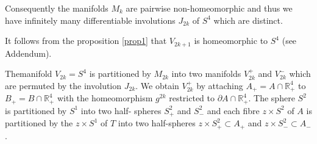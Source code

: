 Consequently the manifolds $M_k$ are pairwise non-homeomorphic  and
thus we have infinitely many differentiable involutions $J_{2k}$ of
$S^4$ which are distinct. 

It follows from the proposition \ref{prop1} that $V_{2k +1}$ is homeomorphic
to $S^4$ (see Addendum). 

The\pageoriginale manifold $V_{2k} = S^4$  is partitioned by $M_{2k}$
into two 
manifolds $V^+ _{2k}$ and $V^-_{2k}$ which are permuted by the
involution $J_{2k}$. We obtain $V^+ _{2k}$ by attaching $A_+ = A \cap
\mathbb{R}^{4}_+$ to $B_+  = B \cap \mathbb{R}^4_+$ with the
homeomorphism $g^{2k}$ restricted to 
$\partial A \cap \mathbb{R}^{4}_+$. The sphere $S^2$ is partitioned by
$S^1$ into two half- spheres $S_+^2$ and $S_-^2$ and each
fibre $z \times S^2$ of $A$ is partitioned by the $z \times S^1$ of $T$
into two half-spheres $z \times S^2_+ \subset A_+$ and $z \times S^2_-
\subset A_-$.  

